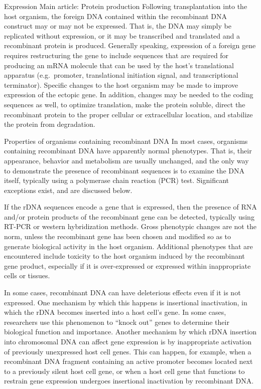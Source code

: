 Expression
Main article: Protein production
Following transplantation into the host organism, the foreign DNA contained within the recombinant DNA construct may or may not be expressed. That is, the DNA may simply be replicated without expression, or it may be transcribed and translated and a recombinant protein is produced. Generally speaking, expression of a foreign gene requires restructuring the gene to include sequences that are required for producing an mRNA molecule that can be used by the host's translational apparatus (e.g.~promoter, translational initiation signal, and transcriptional terminator). Specific changes to the host organism may be made to improve expression of the ectopic gene. In addition, changes may be needed to the coding sequences as well, to optimize translation, make the protein soluble, direct the recombinant protein to the proper cellular or extracellular location, and stabilize the protein from degradation.

Properties of organisms containing recombinant DNA
In most cases, organisms containing recombinant DNA have apparently normal phenotypes. That is, their appearance, behavior and metabolism are usually unchanged, and the only way to demonstrate the presence of recombinant sequences is to examine the DNA itself, typically using a polymerase chain reaction (PCR) test. Significant exceptions exist, and are discussed below.

If the rDNA sequences encode a gene that is expressed, then the presence of RNA and/or protein products of the recombinant gene can be detected, typically using RT-PCR or western hybridization methods. Gross phenotypic changes are not the norm, unless the recombinant gene has been chosen and modified so as to generate biological activity in the host organism. Additional phenotypes that are encountered include toxicity to the host organism induced by the recombinant gene product, especially if it is over-expressed or expressed within inappropriate cells or tissues.

In some cases, recombinant DNA can have deleterious effects even if it is not expressed. One mechanism by which this happens is insertional inactivation, in which the rDNA becomes inserted into a host cell's gene. In some cases, researchers use this phenomenon to ``knock out'' genes to determine their biological function and importance. Another mechanism by which rDNA insertion into chromosomal DNA can affect gene expression is by inappropriate activation of previously unexpressed host cell genes. This can happen, for example, when a recombinant DNA fragment containing an active promoter becomes located next to a previously silent host cell gene, or when a host cell gene that functions to restrain gene expression undergoes insertional inactivation by recombinant DNA.

